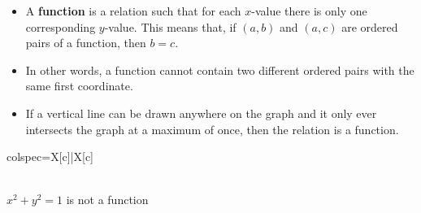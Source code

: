 \documentclass[12pt,a4paper,titlepage]{article}
\begin{document}
            \begin{SummaryBox}[title=Functions VS relations]
                \begin{itemize}[leftmargin=*]
                    \item A \textbf{function} is a relation such that for each $x$-value there is only one corresponding $y$-value. This means that, if $(a,b)$ and $(a,c)$ are ordered pairs of a function, then $b=c$.
                    \item In other words, a function cannot contain two different ordered pairs with the same first coordinate.
                \end{itemize}
                
                \begin{SummaryExtensionBox}[title=Vertical line test, center lower]
                    \begin{itemize}[leftmargin=*]
                        \item If a vertical line can be drawn anywhere on the graph and it only ever intersects the graph at a maximum of once, then the relation is a function.
                    \end{itemize}
                    \tcblower
                    \begin{tblr}{colspec={X[c]|X[c]}}
                        {\\
                        $x^2+y^2=1$ is not a function}
                        

\end{tblr}
\end{SummaryExtensionBox}
\end{SummaryBox}
\end{document}
